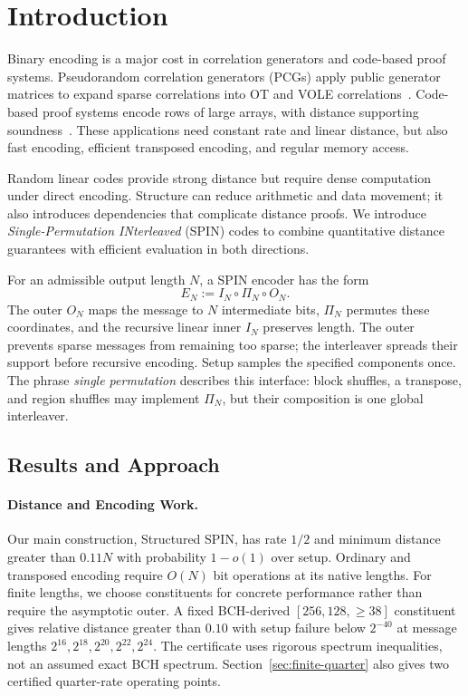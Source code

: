 \section{Introduction}
\label{sec:introduction}

Binary encoding is a major cost in correlation generators and code-based
proof systems. Pseudorandom correlation generators (PCGs) apply public
generator matrices to expand sparse correlations into OT and VOLE
correlations~\cite{bcgi18,bcg19pcg}. Code-based proof systems encode rows
of large arrays, with distance supporting soundness~\cite{brakedown23,blaze25}.
These applications need constant rate and linear distance, but also fast
encoding, efficient transposed encoding, and regular memory access.

Random linear codes provide strong distance but require dense computation
under direct encoding. Structure can reduce arithmetic and data movement;
it also introduces dependencies that complicate distance proofs.
We introduce \emph{Single-Permutation INterleaved} (SPIN) codes to combine
quantitative distance guarantees with efficient evaluation in both directions.

For an admissible output length $N$, a SPIN encoder has the form
\begin{equation}
  E_N := I_N\circ\Pi_N\circ O_N.
  \label{eq:intro-spin-composition}
\end{equation}
The outer $O_N$ maps the message to $N$ intermediate bits, $\Pi_N$ permutes
these coordinates, and the recursive linear inner $I_N$ preserves length.
The outer prevents sparse messages from remaining too sparse; the interleaver
spreads their support before recursive encoding. Setup samples the specified
components once. The phrase \emph{single permutation} describes this
interface: block shuffles, a transpose, and region shuffles may implement
$\Pi_N$, but their composition is one global interleaver.

\subsection{Results and Approach}

\paragraph{Distance and Encoding Work.}
Our main construction, Structured SPIN, has rate $1/2$ and minimum distance
greater than $0.11N$ with probability $1-o(1)$ over setup.
Ordinary and transposed encoding require $O(N)$ bit operations at its native
lengths. For finite lengths, we choose constituents for concrete performance
rather than require the asymptotic outer. A fixed BCH-derived
$[256,128,\ge38]$ constituent gives relative distance greater than $0.10$
with setup failure below $2^{-40}$ at message lengths
$2^{16},2^{18},2^{20},2^{22},2^{24}$.
The certificate uses rigorous spectrum inequalities, not an assumed exact
BCH spectrum. Section~\ref{sec:finite-quarter} also gives two certified
quarter-rate operating points.

